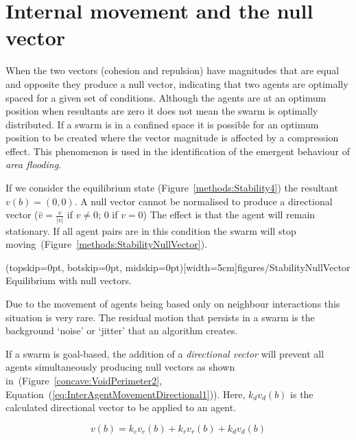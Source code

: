 \documentclass{ieeeaccess}
\begin{document}
\section{Internal movement and the null vector}\label{section:StabilityNullVector}
When the two vectors (cohesion and repulsion) have magnitudes that are equal and opposite they produce a null vector, indicating that two agents are optimally spaced for a given set of conditions. Although the agents are at an optimum position when resultants are zero it does not mean the swarm is optimally distributed. If a swarm is in a confined space it is possible for an optimum position to be created where the vector magnitude is affected by a compression effect. This phenomenon is used in the identification of the emergent behaviour of \emph{area flooding}.  

If we consider the equilibrium state (Figure~\ref{methods:Stability4}) the resultant $v(b)=(0,0)$. A null vector cannot be normalised to produce a directional vector ($\hat{v} = \frac{v}{|v|}$ if $v\neq0$; $0$ if $v=0$) The effect is that the agent will remain stationary. If all agent pairs are in this condition the swarm will stop moving~(Figure~\ref{methods:StabilityNullVector}).

\Figure[t!](topskip=0pt, botskip=0pt, midskip=0pt)[width=5cm]{figures/StabilityNullVector}
{Equilibrium with null vectors.\label{methods:StabilityNullVector}}


Due to the movement of agents being based only on neighbour interactions this situation is very rare. The residual motion that persists in a swarm is the background `noise' or `jitter' that an algorithm creates.

If a swarm is goal-based, the addition of a \emph{directional vector} will prevent all agents simultaneously producing null vectors as shown in~(Figure~\ref{concave:VoidPerimeter2}, Equation~(\ref{eq:InterAgentMovementDirectional1})). Here, $k_dv_{d}(b)$ is the calculated directional vector to be applied to an agent.

\begin{equation}\label{eq:InterAgentMovementDirectional1}
v(b) = k_cv_{c}(b) + k_rv_{r}(b) + k_dv_{d}(b)
\end{equation}
\end{document}
